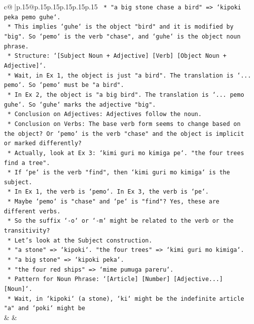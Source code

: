 \documentclass{article}
\begin{document}
{\begin{supertabular}{c@{$\;$}|p{.15\linewidth}@{}p{.15\linewidth}p{.15\linewidth}p{.15\linewidth}p{.15\linewidth}p{.15\linewidth}}
{{{\texttt{    *   "a big stone chase a bird" => `kipoki peka pemo guhe`.} \\
\texttt{    *   This implies `guhe` is the object "bird" and it is modified by "big". So `pemo` is the verb "chase", and `guhe` is the object noun phrase.} \\
\texttt{    *   Structure: `{[}Subject Noun + Adjective{]} {[}Verb{]} {[}Object Noun + Adjective{]}`.} \\
\texttt{    *   Wait, in Ex 1, the object is just "a bird". The translation is `... pemo`. So `pemo` must be "a bird".} \\
\texttt{    *   In Ex 2, the object is "a big bird". The translation is `... pemo guhe`. So `guhe` marks the adjective "big".} \\
\texttt{    *   Conclusion on Adjectives: Adjectives follow the noun.} \\
\texttt{    *   Conclusion on Verbs: The base verb form seems to change based on the object? Or `pemo` is the verb "chase" and the object is implicit or marked differently?} \\
\texttt{    *   Actually, look at Ex 3: `kimi guri mo kimiga pe`. "the four trees find a tree".} \\
\texttt{    *   If `pe` is the verb "find", then `kimi guri mo kimiga` is the subject.} \\
\texttt{    *   In Ex 1, the verb is `pemo`. In Ex 3, the verb is `pe`.} \\
\texttt{    *   Maybe `pemo` is "chase" and `pe` is "find"? Yes, these are different verbs.} \\
\texttt{    *   So the suffix `{-}o` or `{-}m` might be related to the verb or the transitivity?} \\
\texttt{    *   Let's look at the Subject construction.} \\
\texttt{    *   "a stone" => `kipoki`. "the four trees" => `kimi guri mo kimiga`.} \\
\texttt{    *   "a big stone" => `kipoki peka`.} \\
\texttt{    *   "the four red ships" => `mime pumuga pareru`.} \\
\texttt{    *   Pattern for Noun Phrase: `{[}Article{]} {[}Number{]} {[}Adjective...{]} {[}Noun{]}`.} \\
\texttt{    *   Wait, in `kipoki` (a stone), `ki` might be the indefinite article "a" and `poki` might be} \\
            }
        }
    }
    & & \\ \\


\end{supertabular}}
\end{document}
